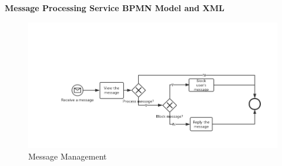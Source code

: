 \documentclass[runningheads]{llncs}
\begin{document}
	\noindent 
\textbf{Message Processing Service BPMN Model and XML}

\begin{figure}
  \centering
  \includegraphics[width=1\textwidth]{figure/pmz/MessageManagement.png}
  \caption{Message Management}
\end{figure}
\end{document}
